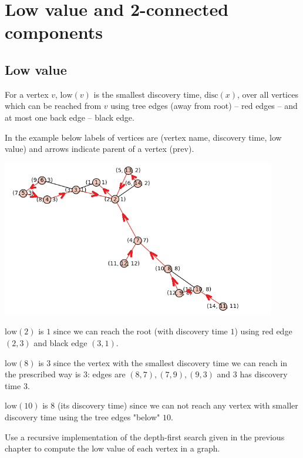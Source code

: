 \chapter{Low value and 2-connected components}

\section{Low value}

For a vertex $v$, $\mathrm{low}(v)$ is the smallest discovery time, $\mathrm{disc}(x)$, over all vertices which can be reached from $v$ using tree edges (away from root) -- red edges -- and at most one back edge -- black edge.

In the example below labels of vertices are (vertex name, discovery time, low value) and arrows indicate parent of a vertex (prev).

\begin{center}
\includegraphics[width=0.9\textwidth]{Images/Low/low.png}
\end{center}

$\mathrm{low}(2)$ is $1$ since we can reach the root (with discovery time $1$) using red edge $(2, 3)$ and black edge $(3, 1)$.

$\mathrm{low}(8)$ is $3$ since the vertex with the smallest discovery time we can reach in the prescribed way is $3$: edges are $(8, 7), (7, 9), (9, 3)$ and $3$ has discovery time $3$.

$\mathrm{low}(10)$ is $8$ (its discovery time) since we can not reach any vertex with smaller discovery time using the tree edges "below" $10$.

\medskip
Use a recursive implementation of the depth-first search given in the previous chapter to compute the low value of each vertex in a graph.

